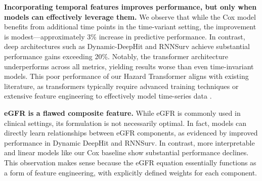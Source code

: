 
\textbf{Incorporating temporal features improves performance, but only when models can effectively leverage them.} We observe that while the Cox model benefits from additional time points in the time-variant setting, the improvement is modest—approximately 3\% increase in predictive performance. In contrast, deep architectures such as Dynamic-DeepHit and RNNSurv achieve substantial performance gains exceeding 20\%. Notably, the transformer architecture underperforms across all metrics, yielding results worse than even time-invariant models. This poor performance of our Hazard Transformer aligns with existing literature, as transformers typically require advanced training techniques or extensive feature engineering to effectively model time-series data \citep{wen2023transformerstimeseriessurvey}.

\textbf{eGFR is a flawed composite feature.} While eGFR is commonly used in clinical settings, its formulation is not necessarily optimal. In fact, models can directly learn relationships between eGFR components, as evidenced by improved performance in Dynamic DeepHit and RNNSurv. In contrast, more interpretable and linear models like our Cox baseline show substantial performance declines. This observation makes sense because the eGFR equation essentially functions as a form of feature engineering, with explicitly defined weights for each component.

